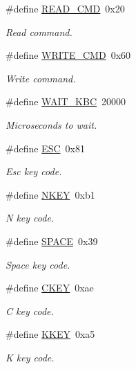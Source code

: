 \begin{DoxyCompactItemize}
\#define \hyperlink{group__Keyboard_ga21623e2a5501c821da54dd76ffc1d077}{R\+E\+A\+D\+\_\+\+C\+MD}~0x20
\begin{DoxyCompactList}\small\item\em Read command. \end{DoxyCompactList}\item 
\#define \hyperlink{group__Keyboard_gaf792feb13ae0c1eab8f95f64c8baa96d}{W\+R\+I\+T\+E\+\_\+\+C\+MD}~0x60
\begin{DoxyCompactList}\small\item\em Write command. \end{DoxyCompactList}\item 
\#define \hyperlink{group__Keyboard_gaa554763d6a066605edecacdea834da9b}{W\+A\+I\+T\+\_\+\+K\+BC}~20000
\begin{DoxyCompactList}\small\item\em Microseconds to wait. \end{DoxyCompactList}\item 
\#define \hyperlink{group__Keyboard_ga4af1b6159e447ba72652bb7fcdfa726e}{E\+SC}~0x81
\begin{DoxyCompactList}\small\item\em Esc key code. \end{DoxyCompactList}\item 
\#define \hyperlink{group__Keyboard_gadee45143f45097e633561db657024e66}{N\+K\+EY}~0xb1
\begin{DoxyCompactList}\small\item\em N key code. \end{DoxyCompactList}\item 
\#define \hyperlink{group__Keyboard_ga5ff6e798033f03e74730e99f01936f84}{S\+P\+A\+CE}~0x39
\begin{DoxyCompactList}\small\item\em Space key code. \end{DoxyCompactList}\item 
\#define \hyperlink{group__Keyboard_ga39f146afd78004fead59358c29028292}{C\+K\+EY}~0xae
\begin{DoxyCompactList}\small\item\em C key code. \end{DoxyCompactList}\item 
\#define \hyperlink{group__Keyboard_ga08bc6a3adcfad743bcba777bfc5cb5ce}{K\+K\+EY}~0xa5
\begin{DoxyCompactList}\small\item\em K key code. \end{DoxyCompactList}\item 

\end{DoxyCompactItemize}
